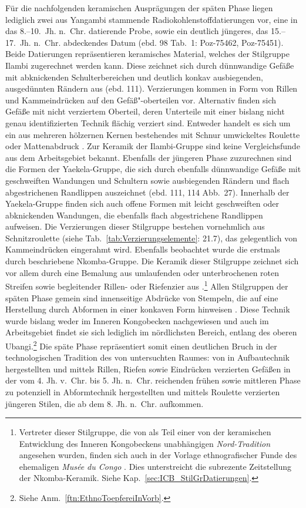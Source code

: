 Für die nachfolgenden keramischen Ausprägungen der späten Phase liegen lediglich zwei aus Yangambi stammende Radiokohlenstoffdatierungen vor, eine in das 8.--10.~Jh. n.~Chr. datierende Probe, sowie ein deutlich jüngeres, das 15.--17.~Jh. n.~Chr. abdeckendes Datum (ebd. 98 Tab.~1: Poz-75462, Poz-75451). Beide Datierungen repräsentieren keramisches Material, welches der Stilgruppe Ilambi zugerechnet werden kann. Diese zeichnet sich durch dünnwandige Gefäße mit abknickenden Schulterbereichen und deutlich konkav ausbiegenden, ausgedünnten Rändern aus (ebd. 111). Verzierungen kommen in Form von Rillen und Kammeindrücken auf den Gefäß"-oberteilen vor. Alternativ finden sich Gefäße mit nicht verziertem Oberteil, deren Unterteile mit einer bislang nicht genau identifizierten Technik flächig verziert sind. Entweder handelt es sich um ein aus mehreren hölzernen Kernen bestehendes mit Schnur umwickeltes \mbox{Roulette} \parencite[101 Abb.~1.29]{LivingstoneSmith.2010b} oder Mattenabdruck \parencite[111, 113 Abb.~26]{LivingstoneSmith.2017}. Zur Keramik der Ilambi-Gruppe sind keine Vergleichsfunde aus dem Arbeitsgebiet bekannt. Ebenfalls der jüngeren Phase zuzurechnen sind die Formen der Yaekela-Gruppe, die sich durch ebenfalls dünnwandige Gefäße mit geschweiften Wandungen und Schultern sowie ausbiegenden Rändern und flach abgestrichenen Randlippen auszeichnet (ebd. 111, 114 Abb.~27). Innerhalb der Yaekela-Gruppe finden sich auch offene Formen mit leicht geschweiften oder abknickenden Wandungen, die ebenfalls flach abgestrichene Randlippen aufweisen. Die Verzierungen dieser Stilgruppe bestehen vornehmlich aus Schnitzroulette (siehe Tab.~\ref{tab:Verzierungselemente}: 21.7), das gelegentlich von Kammeindrücken eingerahmt wird. Ebenfalls beobachtet wurde die erstmals durch \textcite[207--210, 536 Taf.~102.2--4, 6--16]{Wotzka.1995} beschriebene Nkomba-Gruppe. Die Keramik dieser Stilgruppe zeichnet sich vor allem durch eine Bemalung aus umlaufenden oder unterbrochenen roten Streifen sowie begleitender Rillen- oder Riefenzier aus \parencite[114 Abb.~28]{LivingstoneSmith.2017}.\footnote{Vertreter dieser Stilgruppe, die von \textcite[223\,f.]{Wotzka.1995} als Teil einer von der keramischen Entwicklung des Inneren Kongobeckens unabhängigen \textit{Nord-Tradition} angesehen wurden, finden sich auch in der Vorlage ethnografischer Funde des ehemaligen \textit{Musée du Congo} \parencite[152--154, 157--159, Taf.~13.189--191]{Coart.1907}. Dies unterstreicht die subrezente Zeitstellung der Nkomba-Keramik. Siehe Kap.~\ref{sec:ICB_StilGrDatierungen}.} Allen Stilgruppen der späten Phase gemein sind innenseitige Abdrücke von Stempeln, die auf eine Herstellung durch Abformen in einer konkaven Form hinweisen \parencite[111]{LivingstoneSmith.2017}. Diese Technik wurde bislang weder im Inneren Kongobecken nachgewiesen und auch im Arbeitsgebiet findet sie sich lediglich im nördlichsten Bereich, entlang des oberen \mbox{Ubangi}.\footnote{Siehe Anm.~\ref{ftn:EthnoToepfereiInVorb}.} Die späte Phase repräsentiert somit einen deutlichen Bruch in der technologischen Tradition des von \textcite{LivingstoneSmith.2017} untersuchten Raumes: von in Aufbautechnik hergestellten und mittels Rillen, Riefen sowie Eindrücken verzierten Gefäßen in der vom 4. Jh. v.~Chr. bis 5. Jh. n.~Chr. reichenden frühen sowie mittleren Phase zu potenziell in Abformtechnik hergestellten und mittels \mbox{Roulette} verzierten jüngeren Stilen, die ab dem 8. Jh. n.~Chr. aufkommen.